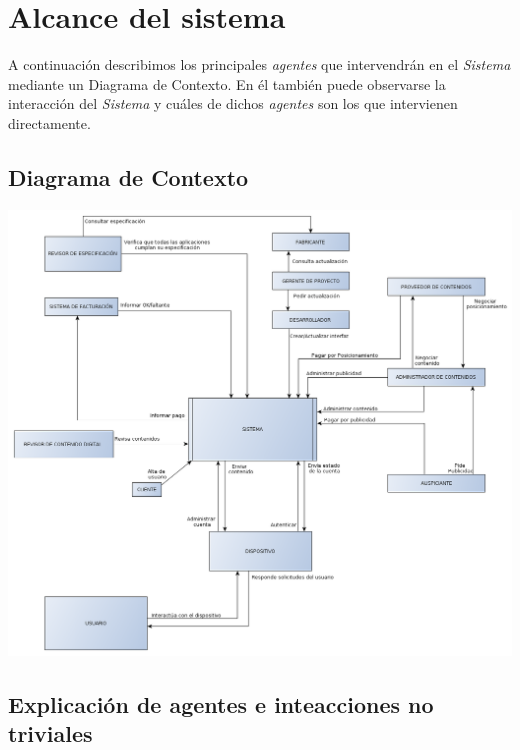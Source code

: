 \documentclass[11pt, a4paper, spanish]{article}
\begin{document}
\section{Alcance del sistema}

	A continuaci\'on describimos los principales \emph{agentes} que intervendr\'an en el \emph{Sistema} mediante un Diagrama de Contexto.
	En \'el tambi\'en puede observarse la interacci\'on del \emph{Sistema} y cu\'ales de dichos \emph{agentes} son los que intervienen directamente.

\subsection{Diagrama de Contexto}

	\begin{center}
		\includegraphics[scale=0.35]{Diagramas/DiagramaContexto.png}
	\end{center}

\newpage

\subsection{Explicaci\'on de agentes e inteacciones no triviales}
\end{document}
